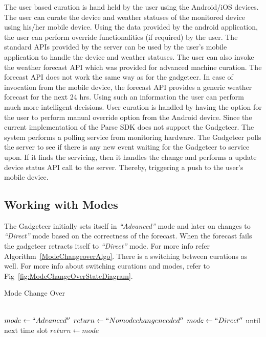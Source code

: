 \documentclass[10pt]{article}
\begin{document}
The user based curation is hand held by the user using the Android/iOS devices. 
The user can curate the device and weather statuses of the monitored device using his/her mobile device.
Using the data provided by the android application, the user can perform override functionalities (if required) by the user.
The standard APIs provided by the server can be used by the user's mobile application to handle the device and weather statuses.
The user can also invoke the weather forecast API which was provided for advanced machine curation.
The forecast API does not work the same way as for the gadgeteer. 
In case of invocation from the mobile device, the forecast API provides a generic weather forecast for the next 24 hrs. 
Using such an information the user can perform much more intelligent decisions.
User curation is handled by having the option for the user to perform manual override option from the Android device.
Since the current implementation of the Parse SDK does not support the Gadgeteer.
The system performs a polling service from monitoring hardware. 
The Gadgeteer polls the server to see if there is any new event waiting for the Gadgeteer to service upon.
If it finds the servicing, then it handles the change and performs a update device status API call to the server. 
Thereby, triggering a push to the user's mobile device.

\subsection*{Working with Modes}

The Gadgeteer initially sets itself in \emph{``Advanced''} mode and later on changes to \emph{``Direct''} mode based on the correctness of the forecast.
When the forecast fails the gadgeteer retracts itself to \emph{``Direct''} mode. 
For more info refer Algorithm~\ref{ModeChangeoverAlgo}. There is a switching between curations as well. For more info about switching curations and modes, refer to Fig~\ref{fig:ModeChangeOverStateDiagram}.

\begin{algorithm}
\caption{Mode Change Over}          %
\label{ModeChangeoverAlgo}      
\begin{algorithmic}
\\
\State $mode \gets ``Advanced''$
    \State $return \gets``No mode change needed''$
\Else
    \State $mode \gets ``Direct''$ until next time slot
\EndIf
\State $return \gets mode$
\end{algorithmic}
\end{algorithm} 
\end{document}
